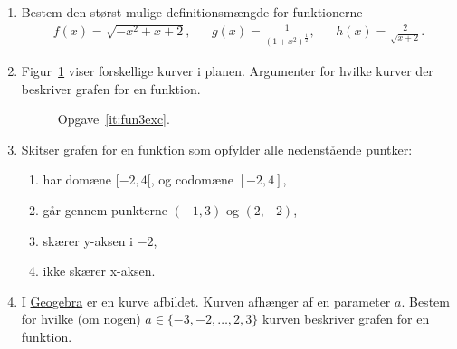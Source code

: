 \begin{enumerate}
	\item Bestem den størst mulige definitionsmængde for funktionerne
	\begin{align*}
	f(x)=\sqrt{-x^2+x+2},&& g(x)=\frac{1}{(1+x^2)^\frac{1}{2}},&& h(x)=\frac{2}{\sqrt{x+2}}.
	\end{align*}
	
	\item \label{it:fun3exc} Figur~\ref{fig:fun3exc} viser forskellige kurver i planen. Argumenter for hvilke kurver der beskriver grafen for en funktion. 
	
 	\begin{figure}
		\centering
		\caption{Opgave~\ref{it:fun3exc}.}
		\label{fig:fun3exc}
	\end{figure}

	\item Skitser grafen for en funktion som opfylder alle nedenstående puntker:
	\begin{enumerate}
		\item har domæne $[-2,4[$, og codomæne $[-2,4]$,
		\item går gennem punkterne $(-1,3)$ og $(2,-2)$,
		\item skærer y-aksen i $-2$,
		\item ikke skærer x-aksen.
		\end{enumerate}
	\item I \href{https://www.geogebra.org/m/eEE7RXzU}{Geogebra} er en kurve afbildet. Kurven afhænger af en parameter $a$. Bestem for hvilke (om nogen) $a\in \{-3,-2,\dots,2,3\}$ kurven beskriver grafen for en funktion.
\end{enumerate}